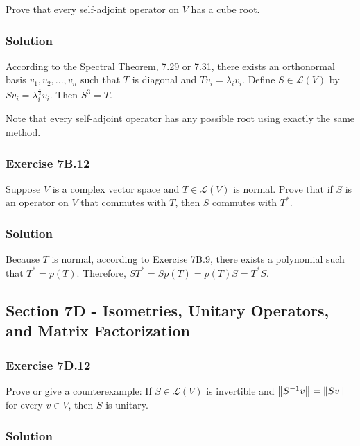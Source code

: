 Prove that every self-adjoint operator on $V$ has a cube root.

\subsubsection*{Solution}

According to the Spectral Theorem, 7.29 or 7.31, there exists an orthonormal basis $v_1, v_2, ..., v_n$ such that $T$ is diagonal and $Tv_i = \lambda_i v_i$.
Define $S \in \mathcal{L}(V)$ by $Sv_i = \lambda_i^{\frac{1}{3}} v_i$.
Then $S^3 = T$.

Note that every self-adjoint operator has any possible root using exactly the same method.


\subsubsection*{Exercise 7B.12}

Suppose $V$ is a complex vector space and $T \in \mathcal{L}(V)$ is normal.
Prove that if $S$ is an operator on $V$ that commutes with $T$, then $S$ commutes with $T^*$.

\subsubsection*{Solution}

Because $T$ is normal, according to Exercise 7B.9, there exists a polynomial such that $T^* = p(T)$.
Therefore, $ST^* = Sp(T) = p(T)S = T^*S$.


\subsection*{Section 7D - Isometries, Unitary Operators, and Matrix Factorization}

\subsubsection*{Exercise 7D.12}

Prove or give a counterexample: If $S \in \mathcal{L}(V)$ is invertible and $\left\lVert S^{-1}v\right\rVert = \left\lVert Sv\right\rVert$ for every $v \in V$, then $S$ is unitary.

\subsubsection*{Solution}

